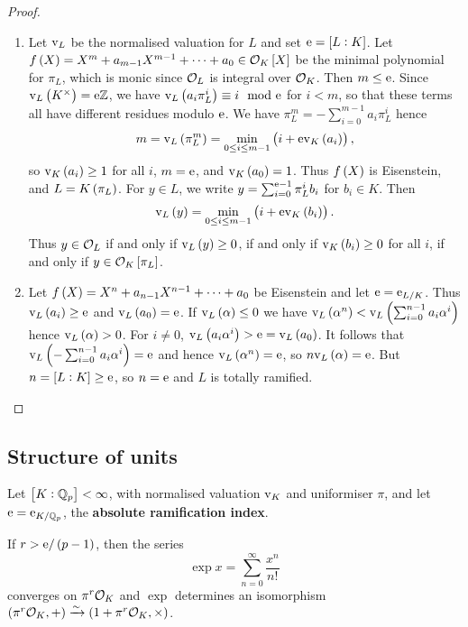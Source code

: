 \begin{proof}
\hfill
\begin{enumerate}
\item Let $ \mathrm{v}_L $ be the normalised valuation for $ L $ and set $ \e = \sbr{L : K} $. Let $ f\br{X} = X^m + a_{m - 1}X^{m - 1} + \dots + a_0 \in \OOO_K\sbr{X} $ be the minimal polynomial for $ \pi_L $, which is monic since $ \mathcal{O}_L $ is integral over $ \mathcal{O}_K $. Then $ m \le \mathrm{e} $. Since $ \v_L\br{K^\times} = \e\ZZ $, we have $ \v_L\br{a_i\pi_L^i} \equiv i \mod \e $ for $ i < m $, so that these terms all have different residues modulo $ \mathrm{e} $. We have $ \pi_L^m = -\sum_{i = 0}^{m - 1} a_i\pi_L^i $ hence
$$ m = \v_L\br{\pi_L^m} = \min_{0 \le i \le m - 1} \br{i + \e\v_K\br{a_i}}, $$
so $ \v_K\br{a_i} \ge 1 $ for all $ i $, $ m = \mathrm{e} $, and $ \v_K\br{a_0} = 1 $. Thus $ f\br{X} $ is Eisenstein, and $ L = K\br{\pi_L} $. For $ y \in L $, we write $ y = \sum_{i = 0}^{\mathrm{e} - 1} \pi_L^ib_i $ for $ b_i \in K $. Then
$$ \v_L\br{y} = \min_{0 \le i \le m - 1} \br{i + \e\v_K\br{b_i}}. $$
Thus $ y \in \mathcal{O}_L $ if and only if $ \v_L\br{y} \ge 0 $, if and only if $ \v_K\br{b_i} \ge 0 $ for all $ i $, if and only if $ y \in \OOO_K\sbr{\pi_L} $.
\item Let $ f\br{X} = X^n + a_{n - 1}X^{n - 1} + \dots + a_0 $ be Eisenstein and let $ \mathrm{e} = \mathrm{e}_{L / K} $. Thus $ \v_L\br{a_i} \ge \e $ and $ \v_L\br{a_0} = \e $. If $ \v_L\br{\alpha} \le 0 $ we have $ \v_L\br{\alpha^n} < \v_L\br{\sum_{i = 0}^{n - 1} a_i\alpha^i} $ hence $ \v_L\br{\alpha} > 0 $. For $ i \ne 0 $, $ \v_L\br{a_i\alpha^i} > \e = \v_L\br{a_0} $. It follows that $ \v_L\br{-\sum_{i = 0}^{n - 1} a_i\alpha^i} = \e $ and hence $ \v_L\br{\alpha^n} = \e $, so $ n\v_L\br{\alpha} = \e $. But $ n = \sbr{L : K} \ge \e $, so $ n = \mathrm{e} $ and $ L $ is totally ramified.
\end{enumerate}
\end{proof}

\pagebreak

\subsection{Structure of units}


Let $ \sbr{K : \QQ_p} < \infty $, with normalised valuation $ \mathrm{v}_K $ and uniformiser $ \pi $, and let $ \mathrm{e} = \mathrm{e}_{K / \mathbb{Q}_p} $, the \textbf{absolute ramification index}.

\begin{proposition}
If $ r > \e / \br{p - 1} $, then the series
$$ \exp x = \sum_{n = 0}^\infty \dfrac{x^n}{n!} $$
converges on $ \pi^r\mathcal{O}_K $ and $ \exp $ determines an isomorphism $ \br{\pi^r\OOO_K, +} \xrightarrow{\sim} \br{1 + \pi^r\OOO_K, \times} $.
\end{proposition}

